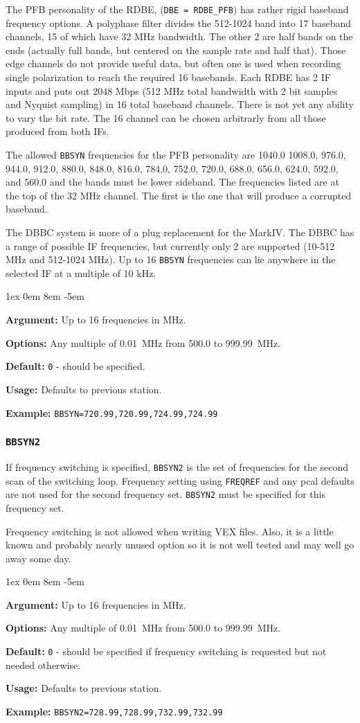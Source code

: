 \documentclass{report}
\newcommand{\rcwbox}[5]{
  \begin{list}{}{\parsep 1ex  \itemsep 0em
                 \leftmargin 8em  \itemindent -5em }
    \item {\bf Argument:} #1
    \item {\bf Options:}  #2
    \item {\bf Default:}  #3
    \item {\bf Usage:}    #4
    \item {\bf Example:}  #5
  \end{list}
}
\begin{document}
The PFB personality of the RDBE, ({\tt DBE = RDBE\_PFB}) has rather
rigid baseband frequency options.  A polyphase filter divides the
512-1024 band into 17 baseband channels, 15 of which have 32 MHz
bandwidth.  The other 2 are half bands on the ends (actually full
bands, but centered on the sample rate and half that).  Those edge
channels do not provide useful data, but often one is used when
recording single polarization to reach the required 16 basebands.
Each RDBE has 2 IF inputs and puts out 2048 Mbps (512 MHz total
bandwidth with 2 bit samples and Nyquist sampling) in 16 total
baseband channels.  There is not yet any ability to vary the bit rate.
The 16 channel can be chosen arbitrarly from all those produced from
both IFs.

The allowed {\tt BBSYN} frequencies for the PFB personality are 1040.0
1008.0, 976.0, 944.0, 912.0, 880.0, 848.0, 816.0, 784.0, 752.0, 720.0,
688.0, 656.0, 624.0, 592.0, and 560.0 and the bands must be lower
sideband.  The frequencies listed are at the top of the 32 MHz
channel.  The first is the one that will produce a corrupted baseband.

The DBBC system is more of a plug replacement for the MarkIV. The DBBC
has a range of possible IF frequencies, but currently only 2 are
supported (10-512 MHz and 512-1024 MHz). Up to 16 {\tt BBSYN} frequencies
can lie anywhere in the selected IF at a multiple of 10 kHz.

\rcwbox
{Up to 16 frequencies in MHz.}
{Any multiple of 0.01~MHz from 500.0 to 999.99~MHz.}
{{\tt 0} - should be specified.}
{Defaults to previous station.}
{{\tt BBSYN=720.99,720.99,724.99,724.99}}


\subsubsection{\label{SP:BBSYN2}{\tt BBSYN2}}

If frequency switching is specified, {\tt BBSYN2} is the
set of frequencies for the second scan of the switching loop.
Frequency setting using {\tt FREQREF} and any pcal defaults are not
used for the second frequency set. {\tt BBSYN2} must be specified for
this frequency set.

Frequency switching is not allowed when writing VEX files.  Also, it
is a little known and probably nearly unused option so it is not
well tested and may well go away some day.

\rcwbox
{Up to 16 frequencies in MHz.}
{Any multiple of 0.01~MHz from 500.0 to 999.99~MHz.}
{{\tt 0} - should be specified if frequency switching is requested
but not needed otherwise.}
{Defaults to previous station.}
{{\tt BBSYN2=728.99,728.99,732.99,732.99}}
\end{document}
